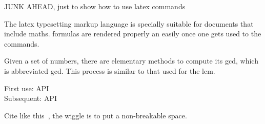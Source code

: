 {\color{red}JUNK AHEAD, just to show how to use latex commands}

The \Gls{latex} typesetting markup language is specially suitable for
documents that include \gls{maths}. \Glspl{formula} are rendered
properly an easily once one gets used to the commands.

Given a set of numbers, there are elementary methods to compute its
\acrlong{gcd}, which is abbreviated \acrshort{gcd}. This process is
similar to that used for the \acrfull{lcm}.

First use: \gls{API}\\
Subsequent: \gls{API}

Cite like this~\cite{miniboone_collaboration_significant_2018}, the
wiggle is to put a non-breakable space.

